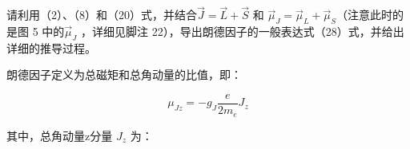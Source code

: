 \documentclass[dvipsnames, svgnames,a4paper,11pt]{article}
\begin{document}
\begin{question}
	请利用（2）、（8）和（20）式，并结合$\vec{J} = \vec{L} + \vec{S}$ 和 $\vec{\mu}_J = \vec{\mu}_L + \vec{\mu}_S $（注意此时的是图 5 中的$\vec{\mu}_J$ ，详细见脚注 22），导出朗德因子的一般表达式（28）式，并给出详细的推导过程。
\end{question}

	












	










	朗德因子定义为总磁矩和总角动量的比值，即：

		\[
		\mu_{Jz} = -g_J \frac{e}{2m_e} J_z
		\]

	其中，总角动量z分量 \( J_z \) 为：
\end{document}
